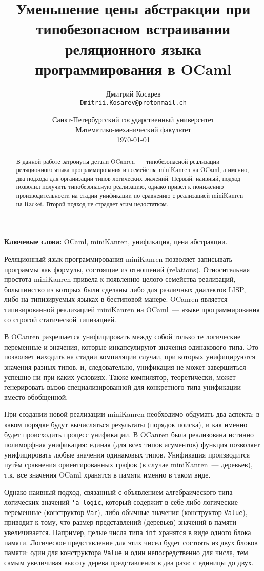 \documentclass[10pt]{article}
\title{Уменьшение цены абстракции при типобезопасном встраивании реляционного языка программирования в OCaml}
\author{
        Дмитрий Косарев\\ \texttt{Dmitrii.Kosarev@protonmail.ch}
}
\date{
  Санкт-Петербургский государственный университет\\
  Математико-механический факультет\\
  \today
}
\begin{document}
\maketitle

\begin{abstract}
В данной работе затронуты детали OCanren~--- типобезопасной реализации реляционного языка программирования
из семейства miniKanren на OCaml, а именно, два подхода для организации типов логических значений. Первый,
наивный, подход позволил получить типобезопасную реализацию, однако привел к понижению производительности
на стадии унификации по сравнению с реализацией miniKanren на Racket. Второй подход не страдает этим 
недостатком.

\end{abstract}

\textbf{Ключевые слова:} OCaml, miniKanren, унификация, цена абстракции.

\vspace{5mm}

Реляционный язык программирования miniKanren позволяет записывать программы как формулы, состоящие из отношений
(relations). Относительная простота miniKanren привела к появлению целого семейства реализаций, большинство из
которых были сделаны либо для различных диалектов LISP, либо на типизируемых языках в бестиповой манере. OCanren 
является типизированной реализацией miniKanren на OCaml~--- языке программирования со строгой статической 
типизацией.

В OCanren разрешается унифицировать между собой только те логические переменные и значения, которые инкапсулируют
значения одинакового типа. Это позволяет находить на стадии компиляции случаи, при которых унифицируются 
значения разных типов, и, следовательно, унификация не может завершиться успешно ни при каких условиях. Также
компилятор, теоретически, может генерировать вызов специализированной для конкретного типа унификации вместо 
обобщенной.

При создании новой реализации miniKanren необходимо обдумать два аспекта: в каком порядке будут вычисляться 
результаты (порядок поиска), и как именно будет происходить процесс унификации. В OCanren была реализована истинно 
полиморфная унификация: единая (для всех типов агументов) функция позволяет унифицировать любые значения одинаковых типов. 
Унификация производится
путём сравнения ориентированных графов (в случае miniKanren~--- деревьев), т.к. все значения OCaml хранятся в 
памяти именно в таком виде.

Однако наивный подход, связанный с объявлением алгебраического типа логических значений \verb|'a logic|, который содержит в себе 
либо логические переменные (конструктор \verb|Var|), либо обычные значения (конструктор \verb|Value|), приводит к тому, что 
размер представлений (деревьев) значений в памяти увеличивается. 
Например, целые числа типа \verb|int| хранятся в виде одного блока памяти. Логическое представление для этих чисел
будет состоять из двух блоков памяти: один для конструктора \verb|Value| и один непосредственно для числа, тем 
самым увеличивая высоту дерева представления в два раза: с единицы до двух. 
\end{document}
